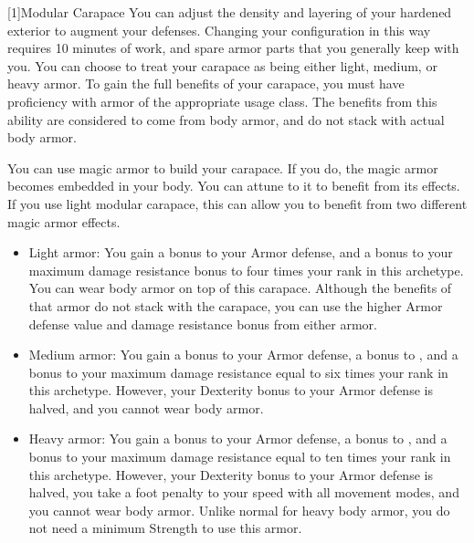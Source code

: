     [1]{Modular Carapace} You can adjust the density and layering of your hardened exterior to augment your defenses.
      Changing your configuration in this way requires 10 minutes of work, and spare armor parts that you generally keep with you.
      You can choose to treat your carapace as being either light, medium, or heavy armor.
      To gain the full benefits of your carapace, you must have proficiency with armor of the appropriate usage class.
      The benefits from this ability are considered to come from body armor, and do not stack with actual body armor.

      You can use magic armor to build your carapace.
      If you do, the magic armor becomes embedded in your body.
      You can attune to it to benefit from its effects.
      If you use light modular carapace, this can allow you to benefit from two different magic armor effects.



      \begin{itemize}
        \item Light armor: You gain a  bonus to your Armor defense, and a bonus to your maximum damage resistance bonus to four times your rank in this archetype.
          You can wear body armor on top of this carapace.
          Although the benefits of that armor do not stack with the carapace, you can use the higher Armor defense value and damage resistance bonus from either armor.
        \item Medium armor: You gain a  bonus to your Armor defense, a  bonus to , and a bonus to your maximum damage resistance equal to six times your rank in this archetype.
          However, your Dexterity bonus to your Armor defense is halved, and you cannot wear body armor.
        \item Heavy armor: You gain a  bonus to your Armor defense, a  bonus to , and a bonus to your maximum damage resistance equal to ten times your rank in this archetype.
          However, your Dexterity bonus to your Armor defense is halved, you take a  foot penalty to your speed with all movement modes, and you cannot wear body armor.
          Unlike normal for heavy body armor, you do not need a minimum Strength to use this armor.
      \end{itemize}

